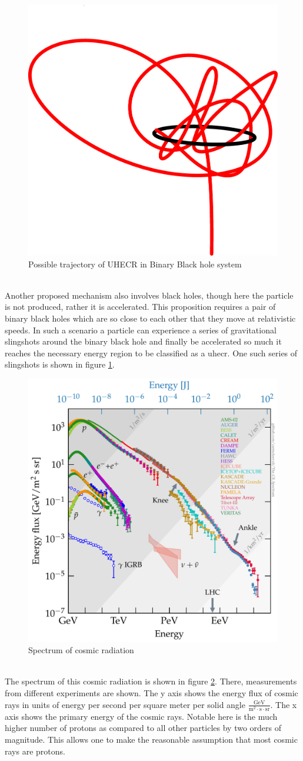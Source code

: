 \documentclass[abstract,toc,los,english,11pt,glossaries]{jluthesis}
\begin{document}
\begin{figure}[ht!]
	\centering
	\includegraphics[width=0.4\linewidth]{data/trajectory-binary-bh}
	\caption{Possible trajectory of UHECR in Binary Black hole system \cite{Zhang2020}}
	\label{fig:trajectory-binary-bh}
\end{figure} \\
Another proposed mechanism also involves black holes, though here the particle is not produced, rather it is accelerated. This proposition requires a pair of binary black holes which are so close to each other that they move at relativistic speeds. In such a scenario a particle can experience a series of gravitational slingshots\cite{Zhang2020} around the binary black hole and finally be accelerated so much it reaches the necessary energy region to be classified as a \acrshort{uhecr}. One such series of slingshots is shown in figure \ref{fig:trajectory-binary-bh}. \\
\begin{figure}[ht!]
	\centering
	\includegraphics[width=0.5\linewidth]{data/cr_spectrum}
	\caption{Spectrum of cosmic radiation \cite{evoli_carmelo_2020_4396125}}
	\label{fig:cr_spectrum}
\end{figure} \\
The spectrum of this cosmic radiation is shown in figure \ref{fig:cr_spectrum}. There, measurements from different experiments are shown. The y axis shows the energy flux of cosmic rays in units of energy per second per square meter per solid angle $\frac{\text{GeV}}{\text{m}^2\cdot\text{s}\cdot\text{sr}}$. The x axis shows the primary energy of the cosmic rays. Notable here is the much higher number of protons as compared to all other particles by two orders of magnitude. This allows one to make the reasonable assumption that most cosmic rays are protons. \\
\end{document}
